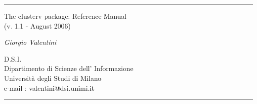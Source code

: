 \documentclass{article}
\begin{document}
\thispagestyle{empty}

\noindent
\rule[6mm]{12.3cm}{0.5mm}


\vspace{0.5cm}
\begin{center}
\begin{minipage}{0.8\textwidth}

{\LARGE
The clusterv package: Reference Manual}\\

\noindent
\vspace{0.5 cm}
(v. 1.1 - August 2006)

\vspace{0.6cm}
{\large \em   Giorgio Valentini}

{ D.S.I. \\
Dipartimento di Scienze dell' Informazione \\
Universit\`a degli Studi di Milano\\
e-mail : valentini@dsi.unimi.it}
\end{minipage}
\end{center}

\vspace{0.5cm}
\noindent
\rule[6mm]{12.3cm}{0.5mm}

\newpage

\clearpage
\end{document}
